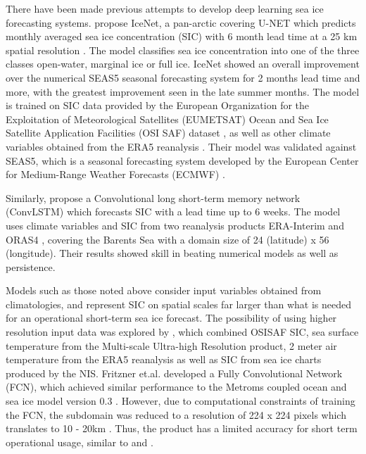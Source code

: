 \documentclass[../main/thesis.tex]{subfiles}
\begin{document}
There have been made previous attempts to develop deep learning sea ice forecasting systems. \citet{Andersson2021} propose IceNet, a pan-arctic covering U-NET which predicts monthly averaged sea ice concentration (SIC) with 6 month lead time at a 25 km spatial resolution \citep{Andersson2021}. The model classifies sea ice concentration into one of the three classes open-water, marginal ice or full ice. IceNet showed an overall improvement over the numerical SEAS5 seasonal forecasting system \citep{Johnson2019} for 2 months lead time and more, with the greatest improvement seen in the late summer months. The model is trained on SIC data provided by the European Organization for the Exploitation of Meteorological Satellites (EUMETSAT) Ocean and Sea Ice Satellite Application Facilities (OSI SAF) dataset \citep{Lavergne2019}, as well as other climate variables obtained from the ERA5 reanalysis \citep{Hersbach2020}. Their model was validated against SEAS5, which is a seasonal forecasting system developed by the European Center for Medium-Range Weather Forecasts (ECMWF) \citep{Johnson2019}.

Similarly, \citet{Liu2021} propose a Convolutional long short-term memory network (ConvLSTM) which forecasts SIC with a lead time up to 6 weeks. The model uses climate variables and SIC from two reanalysis products ERA-Interim \citep{Dee2011} and ORAS4 \citep{Balmaseda2013}, covering the Barents Sea with a domain size of 24 (latitude) x 56 (longitude). Their results showed skill in beating numerical models as well as persistence. 

Models such as those noted above consider input variables obtained from climatologies, and represent SIC on spatial scales far larger than what is needed for an operational short-term sea ice forecast. The possibility of using higher resolution input data was explored by \citet{Fritzner2020}, which combined OSISAF SIC, sea surface temperature from the Multi-scale Ultra-high Resolution product, 2 meter air temperature from the ERA5 reanalysis as well as SIC from sea ice charts produced by the NIS. Fritzner et.al. developed a Fully Convolutional Network (FCN), which achieved similar performance to the Metroms coupled ocean and sea ice model version 0.3 \citep{Kristensen2017}. However, due to computational constraints of training the FCN, the subdomain was reduced to a resolution of 224 x 224 pixels which translates to 10 - 20km \citep{Fritzner2020}. Thus, the product has a limited accuracy for short term operational usage, similar to \citep{Andersson2021} and \citep{Liu2021}.
\end{document}
